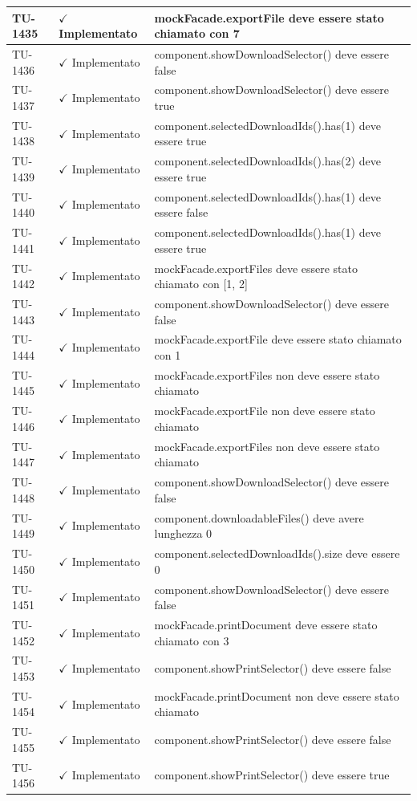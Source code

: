 ﻿\documentclass[a4paper,12pt]{article}
\newcommand{\ok}{\textcolor{green!60!black}{$\checkmark$ Implementato}}
\begin{document}
\begin{longtable}{|p{2cm}|p{3.5cm}|p{9.5cm}|}
\hline
TU-1435 & \ok & mockFacade.exportFile deve essere stato chiamato con 7 \\
\hline
TU-1436 & \ok & component.showDownloadSelector() deve essere false \\
\hline
TU-1437 & \ok & component.showDownloadSelector() deve essere true \\
\hline
TU-1438 & \ok & component.selectedDownloadIds().has(1) deve essere true \\
\hline
TU-1439 & \ok & component.selectedDownloadIds().has(2) deve essere true \\
\hline
TU-1440 & \ok & component.selectedDownloadIds().has(1) deve essere false \\
\hline
TU-1441 & \ok & component.selectedDownloadIds().has(1) deve essere true \\
\hline
TU-1442 & \ok & mockFacade.exportFiles deve essere stato chiamato con [1, 2] \\
\hline
TU-1443 & \ok & component.showDownloadSelector() deve essere false \\
\hline
TU-1444 & \ok & mockFacade.exportFile deve essere stato chiamato con 1 \\
\hline
TU-1445 & \ok & mockFacade.exportFiles non deve essere stato chiamato \\
\hline
TU-1446 & \ok & mockFacade.exportFile non deve essere stato chiamato \\
\hline
TU-1447 & \ok & mockFacade.exportFiles non deve essere stato chiamato \\
\hline
TU-1448 & \ok & component.showDownloadSelector() deve essere false \\
\hline
TU-1449 & \ok & component.downloadableFiles() deve avere lunghezza 0 \\
\hline
TU-1450 & \ok & component.selectedDownloadIds().size deve essere 0 \\
\hline
TU-1451 & \ok & component.showDownloadSelector() deve essere false \\
\hline
TU-1452 & \ok & mockFacade.printDocument deve essere stato chiamato con 3 \\
\hline
TU-1453 & \ok & component.showPrintSelector() deve essere false \\
\hline
TU-1454 & \ok & mockFacade.printDocument non deve essere stato chiamato \\
\hline
TU-1455 & \ok & component.showPrintSelector() deve essere false \\
\hline
TU-1456 & \ok & component.showPrintSelector() deve essere true \\

\end{longtable}
\end{document}
